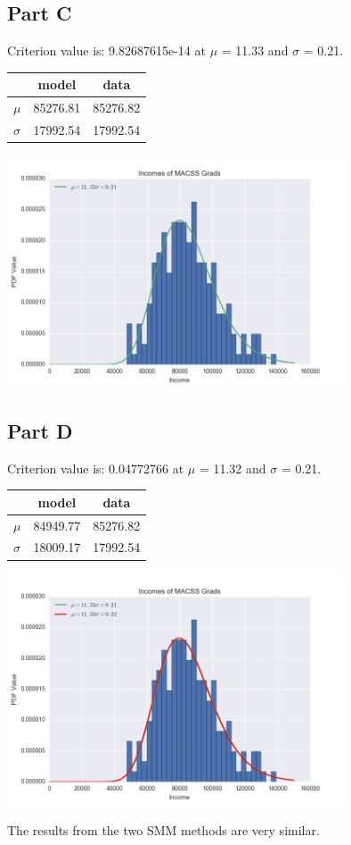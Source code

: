 \documentclass{article}
\begin{document}
\subsection*{Part C}
Criterion value is: 9.82687615e-14 at $\mu$ = 11.33 and $\sigma$ = 0.21.
\begin{center}
  \begin{tabular}{ l | c | c }
    \hline
     & model & data \\ \hline
    $\mu$ & 85276.81 & 85276.82 \\ \hline
    $\sigma$ & 17992.54 & 17992.54 \\ \hline
    \hline
  \end{tabular}
\end{center}
\begin{center}\includegraphics[width=100mm]{images/1c.png}\end{center}


\subsection*{Part D}
Criterion value is: 0.04772766 at $\mu$ = 11.32 and $\sigma$ = 0.21.
\begin{center}
  \begin{tabular}{ l | c | c }
    \hline
     & model & data \\ \hline
    $\mu$ & 84949.77 & 85276.82 \\ \hline
    $\sigma$ & 18009.17 & 17992.54 \\ \hline
    \hline
  \end{tabular}
\end{center}
\begin{center}\includegraphics[width=100mm]{images/1d.png}\end{center}
The results from the two SMM methods are very similar.
\end{document}
